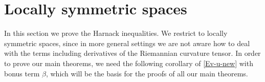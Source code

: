 \section{Locally symmetric spaces}
In this section we prove the Harnack inequalities. We restrict to locally symmetric spaces, since in more general settings we are not aware how to deal with the terms including derivatives of the Riemannian curvature tensor. In order to prove our main theorems, we need the following corollary of \eqref{Ev-u-new} with bonus term $\beta$, which will be the basis for the proofs of all our main theorems.
